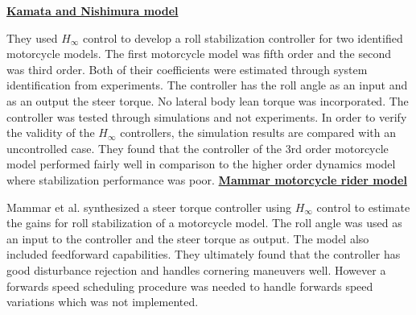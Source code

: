\bigbreak
\underline{\textbf{Kamata and Nishimura model \cite{kamata2003system}}}
\newline
\par
They used \ensuremath{H_\infty} control to develop a roll stabilization controller for two identified motorcycle models. The first motorcycle model was fifth order and the second was third order. Both of their coefficients were estimated through system identification from experiments. The controller has the roll angle as an input and as an output the steer torque. No lateral body lean torque was incorporated. The controller was tested through simulations and not experiments. In order to verify the validity of the \ensuremath{H_\infty} controllers, the simulation results are compared with an uncontrolled case. They found that the controller of the 3rd order motorcycle model performed fairly well in comparison to the higher order dynamics model where stabilization performance was poor.
\bigbreak
\underline{\textbf{Mammar motorcycle rider model \cite{mammar2005motorcycle}}}
\newline
\par
Mammar et al. synthesized a steer torque controller using  \ensuremath{H_\infty} control to estimate the gains for roll stabilization of a motorcycle model. The roll angle was used as an input to the controller and the steer torque as output. The model also included feedforward capabilities. They ultimately found that the controller has good disturbance rejection and  handles cornering maneuvers well. However a forwards speed scheduling procedure was needed to handle forwards speed variations which was not implemented.


